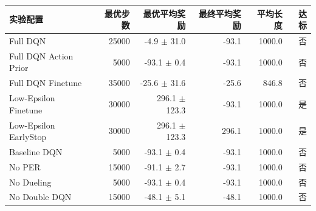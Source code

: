 \begin{tabular}{lrrrrr}\toprule
实验配置 & 最优步数 & 最优平均奖励 & 最终平均奖励 & 平均长度 & 达标 \\
\midrule
Full DQN & 25000 & -4.9 $\pm$ 31.0 & -93.1 & 1000.0 & 否 \\
Full DQN Action Prior & 5000 & -93.1 $\pm$ 0.4 & -93.1 & 1000.0 & 否 \\
Full DQN Finetune & 35000 & -25.6 $\pm$ 31.6 & -25.6 & 846.8 & 否 \\
Low-Epsilon Finetune & 30000 & 296.1 $\pm$ 123.3 & -93.1 & 1000.0 & 是 \\
Low-Epsilon EarlyStop & 30000 & 296.1 $\pm$ 123.3 & 296.1 & 1000.0 & 是 \\
Baseline DQN & 5000 & -93.1 $\pm$ 0.4 & -93.1 & 1000.0 & 否 \\
No PER & 15000 & -91.1 $\pm$ 2.7 & -93.1 & 1000.0 & 否 \\
No Dueling & 5000 & -93.1 $\pm$ 0.4 & -93.1 & 1000.0 & 否 \\
No Double DQN & 15000 & -48.1 $\pm$ 5.1 & -48.1 & 1000.0 & 否 \\
\bottomrule
\end{tabular}
